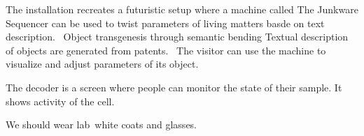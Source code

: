 The installation recreates a futuristic setup where a machine called
{\textquotesingle}The Junkware Sequencer{\textquotesingle} can be used
to twist parameters of living matters basde on text description.~
Object transgenesis through semantic bending
Textual description of objects are generated from patents.~
The visitor can use the machine to visualize and adjust parameters of
its object.

\bigskip

The decoder is a screen where people can monitor the state of their
sample.
It shows activity of the cell.

\bigskip

We should wear lab~white coats and glasses.
